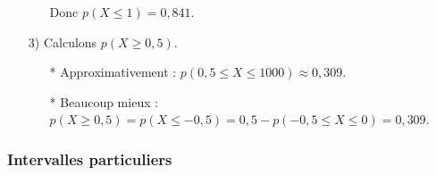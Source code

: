 \begin{itemize}
\begin{itemize}
\begin{tikzpicture}[line cap=round,line join=round,>=triangle 45,x=1cm,y=10cm,scale=.5]
\end{tikzpicture}

Donc $p\left( X\leqslant 1\right) = 0,841$. \\
\end{itemize} 

\item[3)] Calculons $p\left(X \geqslant 0,5\right)$. 

\begin{itemize}
\item[*] Approximativement : $p\left(0,5 \leqslant X \leqslant 1000\right) \approx 0,309$. 
\item[*] Beaucoup mieux : $p\left(X \geqslant 0,5\right) = p\left(X \leqslant -0,5\right) = 0,5 - p\left(-0,5 \leqslant X \leqslant 0\right) = 0,309$.
\end{itemize}
\end{itemize}

\subsubsection{Intervalles particuliers}

